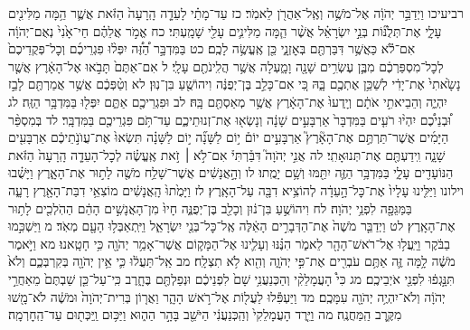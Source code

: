 \documentclass[twoside, openany, parskip=half, 11pt]{book}
\begin{document}
רביעיכו וַיְדַבֵּ֣ר יְהֹוָ֔ה אֶל־מֹשֶׁ֥ה וְאֶֽל־אַהֲרֹ֖ן לֵאמֹֽר׃ כז עַד־מָתַ֗י לָעֵדָ֤ה הָֽרָעָה֙ הַזֹּ֔את אֲשֶׁ֛ר הֵ֥מָּה מַלִּינִ֖ים עָלָ֑י אֶת־תְּלֻנּ֞וֹת בְּנֵ֣י יִשְׂרָאֵ֗ל אֲשֶׁ֨ר הֵ֧מָּה מַלִּינִ֛ים עָלַ֖י שָׁמָֽעְתִּי׃ כח אֱמֹ֣ר אֲלֵהֶ֗ם חַי־אָ֙נִי֙ נְאֻם־יְהֹוָ֔ה אִם־לֹ֕א כַּאֲשֶׁ֥ר דִּבַּרְתֶּ֖ם בְּאׇזְנָ֑י כֵּ֖ן אֶֽעֱשֶׂ֥ה לָכֶֽם׃ כט בַּמִּדְבָּ֣ר הַ֠זֶּ֠ה יִפְּל֨וּ פִגְרֵיכֶ֜ם וְכׇל־פְּקֻדֵיכֶם֙ לְכׇל־מִסְפַּרְכֶ֔ם מִבֶּ֛ן עֶשְׂרִ֥ים שָׁנָ֖ה וָמָ֑עְלָה אֲשֶׁ֥ר הֲלִֽינֹתֶ֖ם עָלָֽי׃ ל אִם־אַתֶּם֙ תָּבֹ֣אוּ אֶל־הָאָ֔רֶץ אֲשֶׁ֤ר נָשָׂ֙אתִי֙ אֶת־יָדִ֔י לְשַׁכֵּ֥ן אֶתְכֶ֖ם בָּ֑הּ כִּ֚י אִם־כָּלֵ֣ב בֶּן־יְפֻנֶּ֔ה וִיהוֹשֻׁ֖עַ בִּן־נֽוּן׃ לא וְטַ֨פְּכֶ֔ם אֲשֶׁ֥ר אֲמַרְתֶּ֖ם לָבַ֣ז יִהְיֶ֑ה וְהֵבֵיאתִ֣י אֹתָ֔ם וְיָֽדְעוּ֙ אֶת־הָאָ֔רֶץ אֲשֶׁ֥ר מְאַסְתֶּ֖ם בָּֽהּ׃ לב וּפִגְרֵיכֶ֖ם אַתֶּ֑ם יִפְּל֖וּ בַּמִּדְבָּ֥ר הַזֶּֽה׃ לג וּ֠בְנֵיכֶ֠ם יִהְי֨וּ רֹעִ֤ים בַּמִּדְבָּר֙ אַרְבָּעִ֣ים שָׁנָ֔ה וְנָשְׂא֖וּ אֶת־זְנוּתֵיכֶ֑ם עַד־תֹּ֥ם פִּגְרֵיכֶ֖ם בַּמִּדְבָּֽר׃ לד בְּמִסְפַּ֨ר הַיָּמִ֜ים אֲשֶׁר־תַּרְתֶּ֣ם אֶת־הָאָ֘רֶץ֮ אַרְבָּעִ֣ים יוֹם֒ י֣וֹם לַשָּׁנָ֞ה י֣וֹם לַשָּׁנָ֗ה תִּשְׂאוּ֙ אֶת־עֲוֺנֹ֣תֵיכֶ֔ם אַרְבָּעִ֖ים שָׁנָ֑ה וִֽידַעְתֶּ֖ם אֶת־תְּנוּאָתִֽי׃ לה אֲנִ֣י יְהֹוָה֮ דִּבַּ֒רְתִּי֒ אִם־לֹ֣א ׀ זֹ֣את אֶֽעֱשֶׂ֗ה לְכׇל־הָעֵדָ֤ה הָֽרָעָה֙ הַזֹּ֔את הַנּוֹעָדִ֖ים עָלָ֑י בַּמִּדְבָּ֥ר הַזֶּ֛ה יִתַּ֖מּוּ וְשָׁ֥ם יָמֻֽתוּ׃ לו וְהָ֣אֲנָשִׁ֔ים אֲשֶׁר־שָׁלַ֥ח מֹשֶׁ֖ה לָת֣וּר אֶת־הָאָ֑רֶץ וַיָּשֻׁ֗בוּ וילונו וַיַּלִּ֤ינוּ עָלָיו֙ אֶת־כׇּל־הָ֣עֵדָ֔ה לְהוֹצִ֥יא דִבָּ֖ה עַל־הָאָֽרֶץ׃ לז וַיָּמֻ֙תוּ֙ הָֽאֲנָשִׁ֔ים מוֹצִאֵ֥י דִבַּת־הָאָ֖רֶץ רָעָ֑ה בַּמַּגֵּפָ֖ה לִפְנֵ֥י יְהֹוָה׃ לח וִיהוֹשֻׁ֣עַ בִּן־נ֔וּן וְכָלֵ֖ב בֶּן־יְפֻנֶּ֑ה חָיוּ֙ מִן־הָאֲנָשִׁ֣ים הָהֵ֔ם הַהֹֽלְכִ֖ים לָת֥וּר אֶת־הָאָֽרֶץ׃ לט וַיְדַבֵּ֤ר מֹשֶׁה֙ אֶת־הַדְּבָרִ֣ים הָאֵ֔לֶּה אֶֽל־כׇּל־בְּנֵ֖י יִשְׂרָאֵ֑ל וַיִּֽתְאַבְּל֥וּ הָעָ֖ם מְאֹֽד׃ מ וַיַּשְׁכִּ֣מוּ בַבֹּ֔קֶר וַיַּֽעֲל֥וּ אֶל־רֹאשׁ־הָהָ֖ר לֵאמֹ֑ר הִנֶּ֗נּוּ וְעָלִ֛ינוּ אֶל־הַמָּק֛וֹם אֲשֶׁר־אָמַ֥ר יְהֹוָ֖ה כִּ֥י חָטָֽאנוּ׃ מא וַיֹּ֣אמֶר מֹשֶׁ֔ה לָ֥מָּה זֶּ֛ה אַתֶּ֥ם עֹבְרִ֖ים אֶת־פִּ֣י יְהֹוָ֑ה וְהִ֖וא לֹ֥א תִצְלָֽח׃ מב אַֽל־תַּעֲל֔וּ כִּ֛י אֵ֥ין יְהֹוָ֖ה בְּקִרְבְּכֶ֑ם וְלֹא֙ תִּנָּ֣גְפ֔וּ לִפְנֵ֖י אֹיְבֵיכֶֽם׃ מג כִּי֩ הָעֲמָלֵקִ֨י וְהַכְּנַעֲנִ֥י שָׁם֙ לִפְנֵיכֶ֔ם וּנְפַלְתֶּ֖ם בֶּחָ֑רֶב כִּֽי־עַל־כֵּ֤ן שַׁבְתֶּם֙ מֵאַחֲרֵ֣י יְהֹוָ֔ה וְלֹא־יִהְיֶ֥ה יְהֹוָ֖ה עִמָּכֶֽם׃ מד וַיַּעְפִּ֕לוּ לַעֲל֖וֹת אֶל־רֹ֣אשׁ הָהָ֑ר וַאֲר֤וֹן בְּרִית־יְהֹוָה֙ וּמֹשֶׁ֔ה לֹא־מָ֖שׁוּ מִקֶּ֥רֶב הַֽמַּחֲנֶֽה׃ מה וַיֵּ֤רֶד הָעֲמָלֵקִי֙ וְהַֽכְּנַעֲנִ֔י הַיֹּשֵׁ֖ב בָּהָ֣ר הַה֑וּא וַיַּכּ֥וּם וַֽיַּכְּת֖וּם עַד־הַֽחׇרְמָֽה׃
\end{document}
